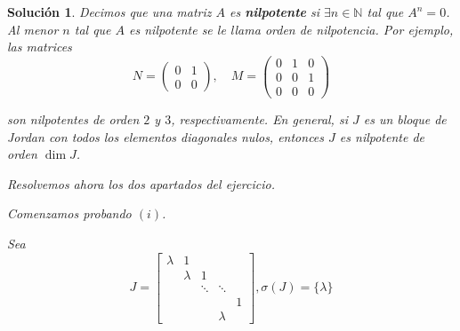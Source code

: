 \documentclass[11pt, a4paper]{article}
\newif\IfInSansMode
\theoremstyle{theorem-style}
\theoremstyle{definition-style}
\theoremstyle{remark-style}
\newtheorem*{sol}{Solución}
\theoremstyle{example-style}
\begin{document}
    \begin{sol}
        Decimos que una matriz $A$ es \textbf{nilpotente} si $\exists n \in \mathbb{N}$ tal
        que $A^n = 0$. Al menor $n$ tal que $A$ es nilpotente se le llama \textit{orden de nilpotencia}. Por ejemplo, las matrices
        $$ N = \begin{pmatrix}
            0 & 1 \\
            0 & 0
        \end{pmatrix}, \quad M = 
        \begin{pmatrix}
            0 & 1 & 0 \\
            0 & 0 & 1\\
            0 & 0 & 0
        \end{pmatrix}$$

        son nilpotentes de orden $2$ y $3$, respectivamente. En general, si $J$ es un bloque de Jordan con todos los elementos diagonales nulos, entonces $J$ es nilpotente de orden $\dim J$.

        Resolvemos ahora los dos apartados del ejercicio.

        Comenzamos probando $(i)$. %

        Sea $$J = \begin{bmatrix}
            \lambda & 1 & & & \\
                    & \lambda & 1 & & \\
                    & & \ddots & \ddots & \\
                    & & & & 1 \\
                    & & & \lambda &
        \end{bmatrix}, \sigma(J) = \{\lambda\}$$


\end{sol}
\end{document}
